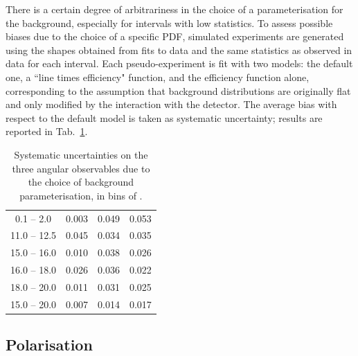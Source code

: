 There is a certain degree of arbitrariness in the choice of a parameterisation for the background,
especially for \qsq intervals with low statistics. To assess possible biases due to the choice of a specific PDF, simulated experiments
are generated using the shapes obtained from fits to data and the same statistics as observed in data for each \qsq interval.
Each pseudo-experiment is fit with two models: the default one, a ``line times efficiency" function, and
the efficiency function alone, corresponding to the assumption that background distributions
are originally flat and only modified by the interaction with the detector. 
The average bias with respect to the default model is taken as systematic uncertainty;
results are reported in Tab.~\ref{tab:bkgParamSys}.
%
%
\begin{center}
\begin{table}[h]
\centering
\caption{ Systematic uncertainties on the three angular observables due to the choice of background parameterisation, in bins of \qsq. }
\begin{tabular}{c|ccc}
 \boldmath{ \qsq [\gevgevcccc] } &  \boldmath{ $\afbl$ }     &  \boldmath{  $\fl$ }      &  \boldmath{ $\afbh$   } \\ \hline
\phantom{x}0.1 -- 2.0\phantom{x}         &  0.003	 &   0.049	  &  0.053		\\
11.0 -- 12.5		&  0.045     &   0.034	  &  0.035     \\
15.0 -- 16.0 	&  0.010     &   0.038    &  0.026     \\
16.0 -- 18.0 	&  0.026     &   0.036    &  0.022     \\
18.0 -- 20.0 	&  0.011     &   0.031    &  0.025     \\
\hline
15.0 -- 20.0		&  0.007     &   0.014    &  0.017     \\
\end{tabular}
\label{tab:bkgParamSys}
\end{table}
\end{center}




\subsection{Polarisation}
\label{sec:ang_pol_sys}

